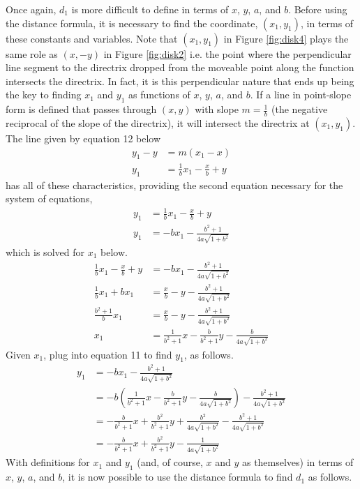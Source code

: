 \documentclass{article}
\begin{document}
Once again, $d_1$ is more difficult to define in terms of $x$, $y$, $a$, and $b$. Before using the distance formula, it is necessary to find the coordinate, $\left(x_1,y_1\right)$, in terms of these constants and variables. Note that $\left(x_1,y_1\right)$ in Figure \ref{fig:disk4} plays the same role as $\left(x,-y\right)$ in Figure \ref{fig:disk2} i.e. the point where the perpendicular line segment to the directrix dropped from the moveable point along the function intersects the directrix. In fact, it is this perpendicular nature that ends up being the key to finding $x_1$ and $y_1$ as functions of $x$, $y$, $a$, and $b$. If a line in point-slope form is defined that passes through $(x,y)$ with slope $m=\frac{1}{b}$ (the negative reciprocal of the slope of the directrix), it will intersect the directrix at $\left(x_1,y_1\right)$. The line given by equation 12 below
\begin{align*}
y_1-y &= m\left(x_1-x\right)\\
y_1 &= \frac{1}{b}x_1-\frac{x}{b}+y\tag{12}
\end{align*}
has all of these characteristics, providing the second equation necessary for the system of equations,
\begin{align*}
y_1 &= \frac{1}{b}x_1-\frac{x}{b}+y\\
y_1 &= -bx_1-\frac{b^2+1}{4a\sqrt{1+b^2}}
\end{align*}
which is solved for $x_1$ below.
\begin{align*}
\frac{1}{b}x_1-\frac{x}{b}+y &= -bx_1-\frac{b^2+1}{4a\sqrt{1+b^2}}\\
\frac{1}{b}x_1+bx_1 &= \frac{x}{b}-y-\frac{b^2+1}{4a\sqrt{1+b^2}}\\
\frac{b^2+1}{b}x_1 &= \frac{x}{b}-y-\frac{b^2+1}{4a\sqrt{1+b^2}}\\
x_1 &= \frac{1}{b^2+1}x-\frac{b}{b^2+1}y-\frac{b}{4a\sqrt{1+b^2}}
\end{align*}
Given $x_1$, plug into equation 11 to find $y_1$, as follows.
\begin{align*}
y_1 &= -bx_1-\frac{b^2+1}{4a\sqrt{1+b^2}}\\
       &= -b\left(\frac{1}{b^2+1}x-\frac{b}{b^2+1}y-\frac{b}{4a\sqrt{1+b^2}}\right)-\frac{b^2+1}{4a\sqrt{1+b^2}}\\
       &= -\frac{b}{b^2+1}x+\frac{b^2}{b^2+1}y+\frac{b^2}{4a\sqrt{1+b^2}}-\frac{b^2+1}{4a\sqrt{1+b^2}}\\
       &= -\frac{b}{b^2+1}x+\frac{b^2}{b^2+1}y-\frac{1}{4a\sqrt{1+b^2}}
\end{align*}
With definitions for $x_1$ and $y_1$ (and, of course, $x$ and $y$ as themselves) in terms of $x$, $y$, $a$, and $b$, it is now possible to use the distance formula to find $d_1$ as follows.
\end{document}
